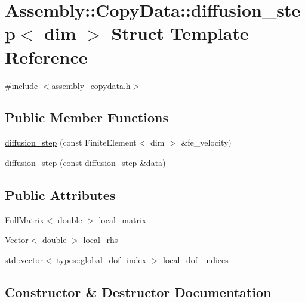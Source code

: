 \hypertarget{struct_assembly_1_1_copy_data_1_1diffusion__step}{}\section{Assembly\+:\+:Copy\+Data\+:\+:diffusion\+\_\+step$<$ dim $>$ Struct Template Reference}
\label{struct_assembly_1_1_copy_data_1_1diffusion__step}


{\ttfamily \#include $<$assembly\+\_\+copydata.\+h$>$}

\subsection*{Public Member Functions}
\begin{DoxyCompactItemize}
\item 
\hyperlink{struct_assembly_1_1_copy_data_1_1diffusion__step_a7d89f395b7b9b9b7fdfac94c4b18fa39}{diffusion\+\_\+step} (const Finite\+Element$<$ dim $>$ \&fe\+\_\+velocity)
\item 
\hyperlink{struct_assembly_1_1_copy_data_1_1diffusion__step_a09e4da08ff4e3920065387031b39e463}{diffusion\+\_\+step} (const \hyperlink{struct_assembly_1_1_copy_data_1_1diffusion__step}{diffusion\+\_\+step} \&data)
\end{DoxyCompactItemize}
\subsection*{Public Attributes}
\begin{DoxyCompactItemize}
\item 
Full\+Matrix$<$ double $>$ \hyperlink{struct_assembly_1_1_copy_data_1_1diffusion__step_ab71ebe2d993b5db8353c7285e2759325}{local\+\_\+matrix}
\item 
Vector$<$ double $>$ \hyperlink{struct_assembly_1_1_copy_data_1_1diffusion__step_ad5d3185b59f3f5c8b56727c7f7722390}{local\+\_\+rhs}
\item 
std\+::vector$<$ types\+::global\+\_\+dof\+\_\+index $>$ \hyperlink{struct_assembly_1_1_copy_data_1_1diffusion__step_acb9f30dc7327a0d8851af7fd52fef039}{local\+\_\+dof\+\_\+indices}
\end{DoxyCompactItemize}


\subsection{Constructor \& Destructor Documentation}
\hypertarget{struct_assembly_1_1_copy_data_1_1diffusion__step_a7d89f395b7b9b9b7fdfac94c4b18fa39}{}
